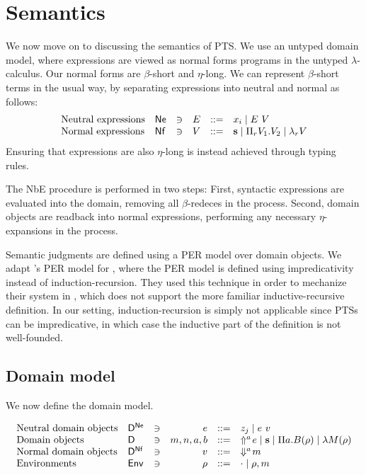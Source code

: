 \section{Semantics}

We now move on to discussing the semantics of \ac{PTS}.
We use an untyped domain model, where expressions are viewed as normal forms programs in the untyped $\lambda$-calculus.
Our normal forms are $\beta$-short and $\eta$-long.
We can represent $\beta$-short terms in the usual way, by separating expressions into neutral and normal as follows:
\[
\begin{array}{llcrcl}
  \mbox{Neutral expressions} & \Ne & \ni & E & ::= & x_i \mid \tmapp E V \\
  \mbox{Normal expressions}  & \Nf & \ni & V & ::= & \tmcst s \mid \tppi {V_1} {V_2} \mid \tmlam V \\
\end{array}
\]
Ensuring that expressions are also $\eta$-long is instead achieved through typing rules.

The \ac{NbE} procedure is performed in two steps:
First, syntactic expressions are evaluated into the domain, removing all $\beta$-redeces in the process.
Second, domain objects are readback into normal expressions, performing any necessary $\eta$-expansions in the process.

Semantic judgments are defined using a \ac{PER} model over domain objects.
We adapt \citet{mctt}'s PER model for \mltt, where the \ac{PER} model is defined using impredicativity instead of induction-recursion.
They used this technique in order to mechanize their system in \rocq, which does not support the more familiar inductive-recursive definition.
In our setting, induction-recursion is simply not applicable since \acp{PTS} can be impredicative, in which case the inductive part of the definition is not well-founded.



\subsection{Domain model}

We now define the domain model.

\[
\begin{array}{llcrcl}
  \mbox{Neutral domain objects} & \mathsf{D}^{\mathsf{Ne}} & \ni & e       & ::=  & z_j \mid e~v \\
  \mbox{Domain objects}         & \mathsf{D} & \ni & m,n,a,b & ::=  & \Uparrow^{a}\!e \mid \textbf{s} \mid \Pi a.B(\rho) \mid \lambda M(\rho)  \\
  \mbox{Normal domain objects}  & \mathsf{D}^{\mathsf{Nf}} & \ni & v       & ::=  & \Downarrow^{a}\!m \\
  \mbox{Environments}           & \mathsf{Env} & \ni & \rho    & ::=  & \cdot \mid \rho, m \\
\end{array}
\]

